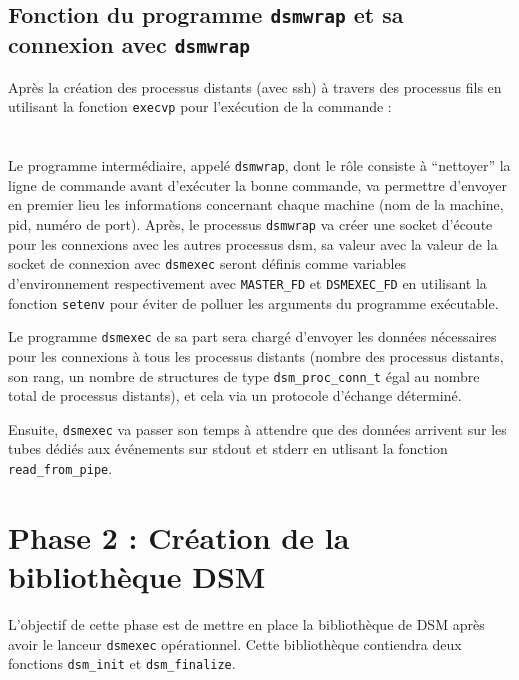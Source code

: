 \subsection{Fonction du programme \texttt{dsmwrap} et sa connexion avec \texttt{dsmwrap}}
Après la création des processus distants (avec ssh) à travers des processus fils en utilisant la fonction \texttt{execvp} pour l'exécution de la commande : \\
\\ \\
Le programme intermédiaire, appelé \texttt{dsmwrap}, dont le rôle
consiste à “nettoyer” la ligne de commande avant d’exécuter la bonne commande, va permettre d'envoyer en premier lieu les informations concernant chaque machine (nom de la machine, pid, numéro de port). Après, le processus \texttt{dsmwrap} va créer une socket d'écoute pour les connexions avec les autres processus dsm, sa valeur avec la valeur de la socket de connexion avec \texttt{dsmexec} seront définis comme variables d'environnement respectivement avec \texttt{MASTER\_FD}  et \texttt{DSMEXEC\_FD} en utilisant la fonction \texttt{setenv} pour éviter de polluer les arguments du programme exécutable.  
\\ \par 
Le programme  \texttt{dsmexec} de sa part sera chargé d’envoyer les données nécessaires pour les connexions à tous les processus distants (nombre des processus distants, son rang, un nombre de structures de type \texttt{dsm\_proc\_conn\_t} égal au nombre total de processus distants), et cela via un protocole d'échange déterminé.\\\par

Ensuite, \texttt{dsmexec} va passer son temps à attendre que des données arrivent sur les tubes dédiés aux événements sur stdout et stderr en utlisant la fonction \texttt{read\_from\_pipe}.


\section{Phase 2 : Création de la bibliothèque DSM}

\setlength{\parindent}{5ex}

L'objectif de cette phase est de mettre en place la bibliothèque de DSM après avoir le lanceur \texttt{dsmexec} opérationnel. Cette bibliothèque contiendra deux fonctions \texttt{dsm\_init} et \texttt{dsm\_finalize}.

